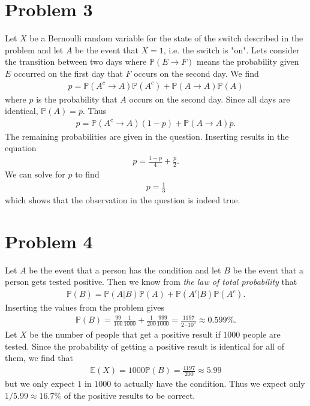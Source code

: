 \documentclass{article}
\renewcommand{\P}{\mathbb{P}}
\newcommand{\E}{\mathbb{E}}
\begin{document}
\section*{Problem 3}
Let $X$ be a Bernoulli random variable for the state of the switch described in the
problem and let $A$ be the event that $X=1$, i.e. the switch is "on". Lets consider 
the transition between two days where $\P(E\to F)$ means the probability given $E$ 
occurred on the first day that $F$ occurs on the second day. We find
\begin{align*}
  p = \P(A^c \to A)\P(A^c) + \P(A\to A)\P(A)
\end{align*}
where $p$ is the probability that $A$ occurs on the second day. Since all days are
identical, $\P(A)=p$. Thus
\begin{align*}
  p = \P(A^c \to A)(1-p) + \P(A\to A)p.
\end{align*}
The remaining probabilities are given in the question. Inserting results in the equation
\begin{align*}
  p=\frac{1-p}{4} + \frac{p}{2}.
\end{align*}
We can solve for $p$ to find 
\begin{align*}
  p=\frac{1}{3}
\end{align*}
which shows that the observation in the question is indeed true.
\section*{Problem 4}
Let $A$ be the event that a person has the condition and let $B$ be the event that
a person gets tested positive. Then we know from \emph{the law of total probability}
that
\begin{align*}
  \P(B) = \P(A|B)\P(A) + \P(A^c|B)\P(A^c).
\end{align*}
Inserting the values from the problem gives
\begin{align*}
  \P(B) = \frac{99}{100}\frac{1}{1000}+\frac{1}{200}\frac{999}{1000}=\frac{1197}{2\cdot 10^5}\approx 0.599\%.
\end{align*}
Let $X$ be the number of people that get a positive result if $1000$ people are tested.
Since the probability of getting a positive result is identical for all of them, we
find that
\begin{align*}
  \E(X) = 1000 \P(B)=\frac{1197}{200}\approx 5.99
\end{align*}
but we only expect $1$ in $1000$ to actually have the condition. Thus
we expect only $1/5.99\approx 16.7\%$ of the positive results to be correct.
\end{document}
